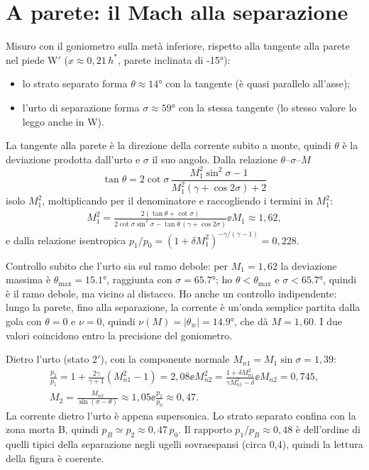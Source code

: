 \section*{A parete: il Mach alla separazione}
Misuro con il goniometro sulla metà inferiore, rispetto alla tangente alla parete nel piede W$'$
($x\approx0{,}21\,h^*$, parete inclinata di \ang{-15}):
\begin{itemize}
\item lo strato separato forma $\theta\approx\ang{14}$ con la tangente (è quasi parallelo all'asse);
\item l'urto di separazione forma $\sigma\approx\ang{59}$ con la stessa tangente (lo stesso valore lo leggo anche
  in W).
\end{itemize}
La tangente alla parete è la direzione della corrente subito a monte, quindi $\theta$ è la deviazione prodotta
dall'urto e $\sigma$ il suo angolo. Dalla relazione $\theta$--$\sigma$--$M$
\[
\tan\theta=2\cot\sigma\,\frac{M_1^2\sin^2\sigma-1}{M_1^2(\gamma+\cos2\sigma)+2}
\]
isolo $M_1^2$, moltiplicando per il denominatore e raccogliendo i termini in $M_1^2$:
\begin{gather*}
M_1^2=\frac{2(\tan\theta+\cot\sigma)}{2\cot\sigma\sin^2\sigma-\tan\theta\,(\gamma+\cos2\sigma)}
\ee M_1\approx1{,}62,
\end{gather*}
e dalla relazione isentropica $p_1/p_0=(1+\delta M_1^2)^{-\gamma/(\gamma-1)}=0{,}228$.

Controllo subito che l'urto sia sul ramo debole: per $M_1=1{,}62$ la deviazione massima è $\theta_{\max}=\ang{15.1}$,
raggiunta con $\sigma=\ang{65.7}$; ho $\theta<\theta_{\max}$ e $\sigma<\ang{65.7}$, quindi è il ramo debole, ma vicino
al distacco. Ho anche un controllo indipendente: lungo la parete, fino alla separazione, la corrente è un'onda
semplice partita dalla gola con $\theta=0$ e $\nu=0$, quindi $\nu(M)=|\theta_w|=\ang{14.9}$, che dà $M=1{,}60$.
I due valori coincidono entro la precisione del goniometro.

Dietro l'urto (stato 2$'$), con la componente normale $M_{n1}=M_1\sin\sigma=1{,}39$:
\begin{gather*}
\frac{p_2}{p_1}=1+\frac{2\gamma}{\gamma+1}\left(M_{n1}^2-1\right)=2{,}08 \ee
M_{n2}^2=\frac{1+\delta M_{n1}^2}{\gamma M_{n1}^2-\delta} \ee M_{n2}=0{,}745,\\
M_2=\frac{M_{n2}}{\sin(\sigma-\theta)}\approx1{,}05 \ee \frac{p_2}{p_0}\approx0{,}47 .
\end{gather*}
La corrente dietro l'urto è appena supersonica. Lo strato separato confina con la zona morta B, quindi
$p_B\simeq p_2\approx0{,}47\,p_0$. Il rapporto $p_1/p_B\approx0{,}48$ è dell'ordine di quelli tipici della
separazione negli ugelli sovraespansi (circa 0,4), quindi la lettura della figura è coerente.

